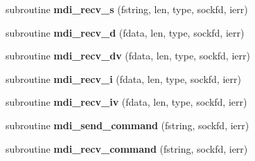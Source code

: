 \begin{DoxyCompactItemize}
\item 
\hypertarget{classmdi_a78af4fc262563d2d8820a3a7cbfe0a92}{subroutine {\bfseries mdi\-\_\-recv\-\_\-s} (fstring, len, type, sockfd, ierr)}\label{classmdi_a78af4fc262563d2d8820a3a7cbfe0a92}

\item 
\hypertarget{classmdi_a557c30482625b71f46ee392d70426014}{subroutine {\bfseries mdi\-\_\-recv\-\_\-d} (fdata, len, type, sockfd, ierr)}\label{classmdi_a557c30482625b71f46ee392d70426014}

\item 
\hypertarget{classmdi_a66dc1c9e1462e5c53bd36c720aa12a38}{subroutine {\bfseries mdi\-\_\-recv\-\_\-dv} (fdata, len, type, sockfd, ierr)}\label{classmdi_a66dc1c9e1462e5c53bd36c720aa12a38}

\item 
\hypertarget{classmdi_a50204266766bbd60ec46f697309b9c5c}{subroutine {\bfseries mdi\-\_\-recv\-\_\-i} (fdata, len, type, sockfd, ierr)}\label{classmdi_a50204266766bbd60ec46f697309b9c5c}

\item 
\hypertarget{classmdi_adb59292b64be533922c3bd55c04df653}{subroutine {\bfseries mdi\-\_\-recv\-\_\-iv} (fdata, len, type, sockfd, ierr)}\label{classmdi_adb59292b64be533922c3bd55c04df653}

\item 
\hypertarget{classmdi_a9b4dc2e960271e8779e842b9e1edc0dd}{subroutine {\bfseries mdi\-\_\-send\-\_\-command} (fstring, sockfd, ierr)}\label{classmdi_a9b4dc2e960271e8779e842b9e1edc0dd}

\item 
\hypertarget{classmdi_a3a3b366cde72e01a9d3a928e902e58d0}{subroutine {\bfseries mdi\-\_\-recv\-\_\-command} (fstring, sockfd, ierr)}\label{classmdi_a3a3b366cde72e01a9d3a928e902e58d0}

\end{DoxyCompactItemize}
